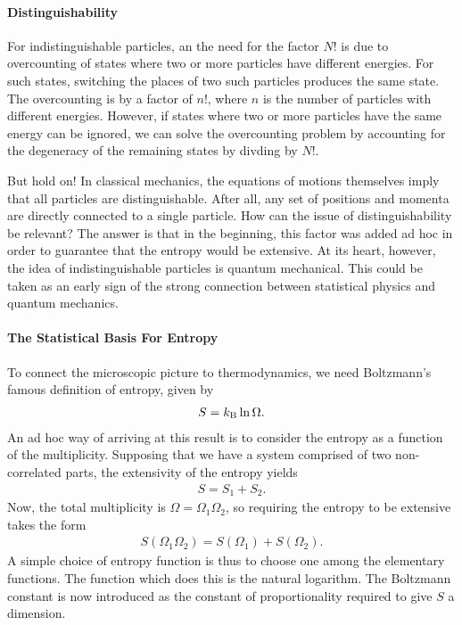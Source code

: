 \paragraph{Distinguishability}
For indistinguishable particles, an the need for the factor $N!$ is due to overcounting of states where two or more particles have different energies. For such states, switching the places of two such particles produces the same state. The overcounting is by a factor of $n!$, where $n$ is the number of particles with different energies. However, if states where two or more particles have the same energy can be ignored, we can solve the overcounting problem by accounting for the degeneracy of the remaining states by divding by $N!$.

But hold on! In classical mechanics, the equations of motions themselves imply that all particles are distinguishable. After all, any set of positions and momenta are directly connected to a single particle. How can the issue of distinguishability be relevant? The answer is that in the beginning, this factor was added ad hoc in order to guarantee that the entropy would be extensive. At its heart, however, the idea of indistinguishable particles is quantum mechanical. This could be taken as an early sign of the strong connection between statistical physics and quantum mechanics.

\paragraph{The Statistical Basis For Entropy}
To connect the microscopic picture to thermodynamics, we need Boltzmann's famous definition of entropy, given by
\begin{align*}
	S = k_{\text{B}}\ln{\Omega}.
\end{align*}
An ad hoc way of arriving at this result is to consider the entropy as a function of the multiplicity. Supposing that we have a system comprised of two non-correlated parts, the extensivity of the entropy yields
\begin{align*}
	S = S_{1} + S_{2}.
\end{align*}
Now, the total multiplicity is $\Omega = \Omega_{1}\Omega_{2}$, so requiring the entropy to be extensive takes the form
\begin{align*}
	S(\Omega_{1}\Omega_{2}) = S(\Omega_{1}) + S(\Omega_{2}).
\end{align*}
A simple choice of entropy function is thus to choose one among the elementary functions. The function which does this is the natural logarithm. The Boltzmann constant is now introduced as the constant of proportionality required to give $S$ a dimension.

